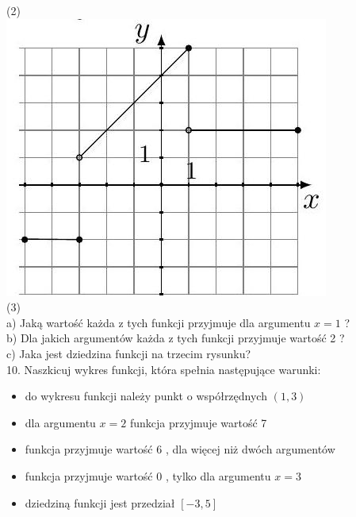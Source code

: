 \documentclass[10pt]{article}
\begin{document}
(2)\\
\includegraphics[max width=\textwidth, center]{2024_11_21_e9b4faa005d5be2cc318g-124(1)}\\
(3)\\
a) Jaką wartość każda z tych funkcji przyjmuje dla argumentu \(x=1\) ?\\
b) Dla jakich argumentów każda z tych funkcji przyjmuje wartość 2 ?\\
c) Jaka jest dziedzina funkcji na trzecim rysunku?\\
10. Naszkicuj wykres funkcji, która spełnia następujące warunki:

\begin{itemize}
  \item do wykresu funkcji należy punkt o współrzędnych \((1,3)\)
  \item dla argumentu \(x=2\) funkcja przyjmuje wartość 7
  \item funkcja przyjmuje wartość 6 , dla więcej niż dwóch argumentów
  \item funkcja przyjmuje wartość 0 , tylko dla argumentu \(x=3\)
  \item dziedziną funkcji jest przedział \([-3,5]\)
\end{itemize}
\end{document}
